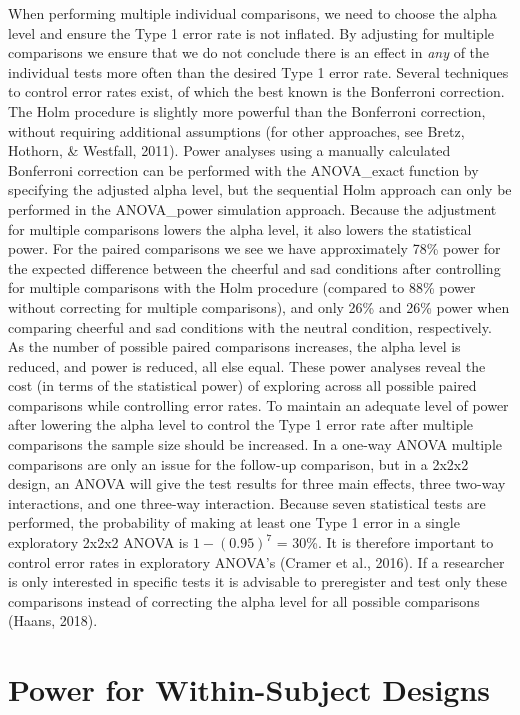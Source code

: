 \documentclass[
  ,jou,floatsintext]{apa6}
\begin{document}
When performing multiple individual comparisons, we need to choose the alpha level and ensure the Type 1 error rate is not inflated.
By adjusting for multiple comparisons we ensure that we do not conclude there is an effect in \emph{any} of the individual tests more often than the desired Type 1 error rate.
Several techniques to control error rates exist, of which the best known is the Bonferroni correction.
The Holm procedure is slightly more powerful than the Bonferroni correction, without requiring additional assumptions (for other approaches, see Bretz, Hothorn, \& Westfall, 2011).
Power analyses using a manually calculated Bonferroni correction can be performed with the ANOVA\_exact function by specifying the adjusted alpha level, but the sequential Holm approach can only be performed in the ANOVA\_power simulation approach.
Because the adjustment for multiple comparisons lowers the alpha level, it also lowers the statistical power.
For the paired comparisons we see we have approximately 78\% power for the expected difference between the cheerful and sad conditions after controlling for multiple comparisons with the Holm procedure (compared to 88\% power without correcting for multiple comparisons), and only 26\% and 26\% power when comparing cheerful and sad conditions with the neutral condition, respectively.
As the number of possible paired comparisons increases, the alpha level is reduced, and power is reduced, all else equal.
These power analyses reveal the cost (in terms of the statistical power) of exploring across all possible paired comparisons while controlling error rates.
To maintain an adequate level of power after lowering the alpha level to control the Type 1 error rate after multiple comparisons the sample size should be increased.
In a one-way ANOVA multiple comparisons are only an issue for the follow-up comparison, but in a 2x2x2 design, an ANOVA will give the test results for three main effects, three two-way interactions, and one three-way interaction.
Because seven statistical tests are performed, the probability of making at least one Type 1 error in a single exploratory 2x2x2 ANOVA is \(1-(0.95)^7\) = 30\%.
It is therefore important to control error rates in exploratory ANOVA's (Cramer et al., 2016).
If a researcher is only interested in specific tests it is advisable to preregister and test only these comparisons instead of correcting the alpha level for all possible comparisons (Haans, 2018).

\hypertarget{power-for-within-subject-designs}{%
\section{Power for Within-Subject Designs}\label{power-for-within-subject-designs}}
\end{document}
